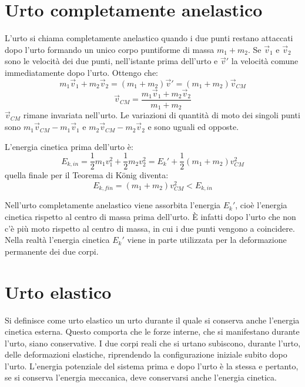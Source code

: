 \documentclass[class=book, crop=false, oneside, 12pt]{standalone}
\begin{document}
\section{Urto completamente anelastico}

L'urto si chiama completamente anelastico quando i due punti restano attaccati dopo l'urto formando un unico corpo puntiforme di massa \(m_1 + m_2\).
Se \(\overrightarrow{v}_1\) e \(\overrightarrow{v}_2\) sono le velocità dei due punti, nell'istante prima dell'urto e \(\overrightarrow{v}'\) la velocità comune immediatamente dopo l'urto.
Ottengo che:
\begin{equation*}
    m_1 \overrightarrow{v}_1 + m_2 \overrightarrow{v}_2 = \left( m_1 + m_2 \right) \overrightarrow{v}' = \left( m_1 + m_2 \right) \overrightarrow{v}_{CM}
\end{equation*} 
\begin{equation*}
    \overrightarrow{v}_{CM} = \frac{m_1 \overrightarrow{v}_1 + m_2 \overrightarrow{v}_2}{m_1 + m_2}
\end{equation*}
\(\overrightarrow{v}_{CM}\) rimane invariata nell'urto. Le variazioni di quantità di moto dei singoli punti sono \(m_1 \overrightarrow{v}_{CM} - m_1 \overrightarrow{v}_{1}\) e \(m_2 \overrightarrow{v}_{CM} - m_2 \overrightarrow{v}_{2}\) e sono uguali ed opposte.

L'energia cinetica prima dell'urto è:
\begin{equation*}
    E_{k,in} = \frac{1}{2} m_1 v_1^2 + \frac{1}{2} m_2 v_2^2 = E_k' + \frac{1}{2} \left( m_1 + m_2 \right) v_{CM}^2
\end{equation*}
quella finale per il Teorema di König diventa: %
\begin{equation*}
    E_{k,fin} = \left( m_1 + m_2 \right) v_{CM}^2 < E_{k,in}
\end{equation*}

Nell'urto completamente anelastico viene assorbita l'energia \(E_k'\), cioè l'energia cinetica rispetto al centro di massa prima dell'urto. 
È infatti dopo l'urto che non c'è più moto rispetto al centro di massa, in cui i due punti vengono a coincidere. 
Nella realtà l'energia cinetica \(E_k'\) viene in parte utilizzata per la deformazione permanente dei due corpi. 

\section{Urto elastico}

Si definisce come urto elastico un urto durante il quale si conserva anche l'energia cinetica esterna.
Questo comporta che le forze interne, che si manifestano durante l'urto, siano conservative. 
I due corpi reali che si urtano subiscono, durante l'urto, delle deformazioni elastiche, riprendendo la configurazione iniziale subito dopo l'urto.
L'energia potenziale del sistema prima e dopo l'urto è la stessa e pertanto, se si conserva l'energia meccanica, deve conservarsi anche l'energia cinetica.
\end{document}
